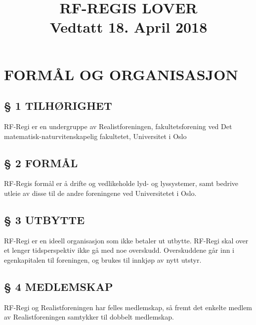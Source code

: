 \documentclass[a4paper,11pt,norsk]{scrartcl}
\providecommand*{\DUdocumentsubtitle}[1]{{\large #1}}
\providecommand*{\DUtransition}{%
  \hspace*{\fill}\hrulefill\hspace*{\fill}
  \vskip 0.5\baselineskip
}
\begin{document}
\title{RF-REGIS LOVER%
  \label{rf-regis-lover}%
  \\%
  \DUdocumentsubtitle{Vedtatt 18. April 2018}%
  \label{vedtatt-18-april-2018}}
\author{}
\date{}
\maketitle

\label{contents}
\tableofcontents

\DUtransition


\section{FORMÅL OG ORGANISASJON%
  \label{formal-og-organisasjon}%
}


\subsection{§ 1 TILHØRIGHET%
  \label{tilhorighet}%
}

RF-Regi er en undergruppe av Realistforeningen, fakultetsforening ved Det
matematisk-naturvitenskapelig fakultetet, Universitet i Oslo


\subsection{§ 2 FORMÅL%
  \label{formal}%
}

RF-Regis formål er å drifte og vedlikeholde lyd- og lyssystemer, samt
bedrive utleie av disse til de andre foreningene ved Universitetet i Oslo.


\subsection{§ 3 UTBYTTE%
  \label{utbytte}%
}

RF-Regi er en ideell organisasjon som ikke betaler ut utbytte.
RF-Regi skal over et lenger tidsperspektiv ikke gå med noe overskudd.
Overskuddene går inn i egenkapitalen til foreningen, og brukes
til innkjøp av nytt utstyr.


\subsection{§ 4 MEDLEMSKAP%
  \label{medlemskap}%
}

RF-Regi og Realistforeningen har felles medlemskap, så fremt det enkelte medlem
av Realistforeningen samtykker til dobbelt medlemskap.
\end{document}
